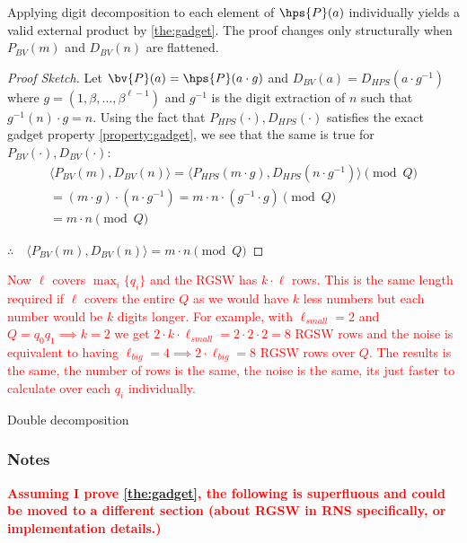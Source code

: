 \begin{corollary}
    Applying digit decomposition to each element of $\hps{P}(a)$ individually yields a valid external product by \autoref{the:gadget}. The proof changes only structurally when $P_{BV}(m)$ and $D_{BV}(n)$ are flattened.

    \begin{proof}[Proof Sketch]
        Let $\bv{P}(a) = \hps{P}(a\cdot g)$ and $D_{BV}(a) = D_{HPS}(a\cdot g^{-1})$ where $g = (1, \beta, \dots, \beta^{\ell-1})$ and $g^{-1}$ is the digit extraction of $n$ such that $g^{-1}(n)\cdot g = n$. Using the fact that $P_{HPS}(\cdot), D_{HPS}(\cdot)$ satisfies the exact gadget property \eqref{property:gadget}, we see that the same is true for $P_{BV}(\cdot), D_{BV}(\cdot)$:
        \begin{gather}
            \langle P_{BV}(m), D_{BV}(n)\rangle = \langle P_{HPS}(m\cdot g), D_{HPS}(n\cdot g^{-1})\rangle \pmod{Q}\\
            = (m\cdot g) \cdot (n\cdot g^{-1}) = m\cdot n \cdot (g^{-1}\cdot g) \pmod{Q} \\
            = m\cdot n \pmod{Q}
        \end{gather}

        $\therefore\quad\langle P_{BV}(m), D_{BV}(n)\rangle = m\cdot n \pmod{Q}$ 
    \end{proof}
\end{corollary}

\begin{remark}
    \textcolor{red}{Now $\ell$ covers $\max_i\{q_i\}$ and the RGSW has $k\cdot\ell$ rows. This is the same length required if $\ell$ covers the entire $Q$ as we would have $k$ less numbers but each number would be $k$ digits longer. For example, with $\ell_{small} = 2$ and $Q=q_0q_1 \implies k = 2$ we get $2\cdot k \cdot \ell_{small} =2\cdot 2\cdot 2 = 8$ RGSW rows and the noise is equivalent to having $\ell_{big} = 4 \implies 2\cdot\ell_{big} = 8$ RGSW rows over $Q$. The results is the same, the number of rows is the same, the noise is the same, its just faster to calculate over each $q_i$ individually.}
\end{remark}

Double decomposition 

\ifnotes
    \newpage
    \subsubsection{Notes}
    \noindent\textcolor{red}{\textbf{Assuming I prove \autoref{the:gadget}, the following is superfluous and could be moved to a different section (about RGSW in RNS specifically, or implementation details.)}}
    
